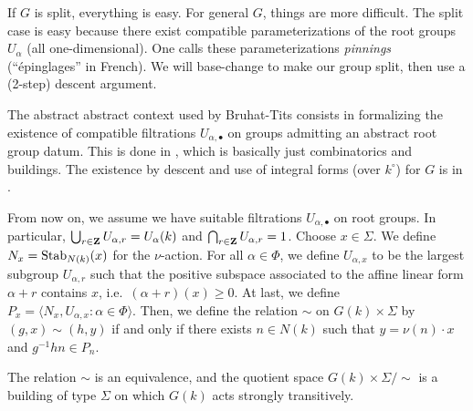 If $G$ is split, everything is easy. For general $G$, things are more 
difficult. The split case is easy because there exist compatible parameterizations 
of the root groups $U_\alpha$ (all one-dimensional). One calls these 
parameterizations \emph{pinnings} (``\'epinglages'' in French). We will 
base-change to make our group split, then use a (2-step) descent argument. 

The abstract abstract context used by Bruhat-Tits consists in formalizing the 
existence of compatible filtrations $U_{\alpha,\bullet}$ on groups admitting 
an abstract root group datum. This is done in \cite{bt72}, which is basically 
just combinatorics and buildings. The existence by descent and use of integral 
forms (over $k^\circ$) for $G$ is in \cite{bt84}. 

From now on, we assume we have suitable filtrations $U_{\alpha,\bullet}$ on 
root groups. In particular, $\bigcup_{r\in \mathbf{Z}} U_{\alpha,r} = U_\alpha(k)$ 
and $\bigcap_{r\in \mathbf{Z}} U_{\alpha,r} = 1$. Choose $x\in \Sigma$. We define 
$N_x=\operatorname{Stab}_{N(k)}(x)$ for the $\nu$-action. For all 
$\alpha\in \Phi$, we define $U_{\alpha,x}$ to be the largest subgroup 
$U_{\alpha,r}$ such that the positive subspace associated to the affine linear form 
$\alpha+r$ contains $x$, i.e.\ $(\alpha+r)(x)\geqslant 0$. At last, we 
define $P_x=\langle N_x,U_{\alpha,x}:\alpha\in \Phi\rangle$. Then, we define the 
relation $\sim$ on $G(k)\times \Sigma$ by 
$(g,x)\sim(h,y)$ if and only if there exists $n\in N(k)$ such that 
$y=\nu(n)\cdot x$ and $g^{-1} h n\in P_n$. 

\begin{theo}
The relation $\sim$ is an equivalence, and the quotient space 
$G(k)\times \Sigma/\sim$ is a building of type $\Sigma$ on which $G(k)$ acts 
strongly transitively. 
\end{theo}





%
%

%
